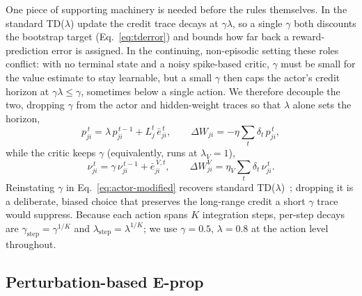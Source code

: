 \documentclass[10pt,twocolumn]{article}
\begin{document}
One piece of supporting machinery is needed before the rules themselves. In the
standard TD($\lambda$) update the credit trace decays at $\gamma\lambda$, so a
single $\gamma$ both discounts the bootstrap target (Eq.~\eqref{eq:tderror}) and
bounds how far back a reward-prediction error is assigned. In the continuing,
non-episodic setting these roles conflict: with no terminal state and a noisy
spike-based critic, $\gamma$ must be small for the value estimate to stay
learnable, but a small $\gamma$ then caps the actor's credit horizon at
$\gamma\lambda\le\gamma$, sometimes below a single action. We therefore decouple
the two, dropping $\gamma$ from the actor and hidden-weight traces so that
$\lambda$ alone sets the horizon,
\begin{equation}
p^{\,t}_{ji} = \lambda\, p^{\,t-1}_{ji} + L^t_j\,\bar e^{\,t}_{ji},
\qquad \Delta W_{ji} = -\eta\sum_t \delta_t\, p^{\,t}_{ji},
\label{eq:actor-modified}
\end{equation}
while the critic keeps $\gamma$ (equivalently, runs at $\lambda_V=1$),
\begin{equation}
\nu^{\,t}_{ji} = \gamma\,\nu^{\,t-1}_{ji} + \bar e^{\,V,t}_{ji},
\qquad \Delta W^V_{ji} = \eta_V\sum_t \delta_t\,\nu^{\,t}_{ji}.
\label{eq:critic-modified}
\end{equation}
Reinstating $\gamma$ in Eq.~\eqref{eq:actor-modified} recovers standard
TD($\lambda$)~\citep{SuttonBarto2018}; dropping it is a deliberate, biased choice that preserves the
long-range credit a short $\gamma$ trace would suppress. Because each action
spans $K$ integration steps, per-step decays are
$\gamma_{\mathrm{step}}=\gamma^{1/K}$ and
$\lambda_{\mathrm{step}}=\lambda^{1/K}$; we use $\gamma=0.5$, $\lambda=0.8$
at the action level throughout.

\subsection{Perturbation-based E-prop}
\label{sec:distributed}
\end{document}
